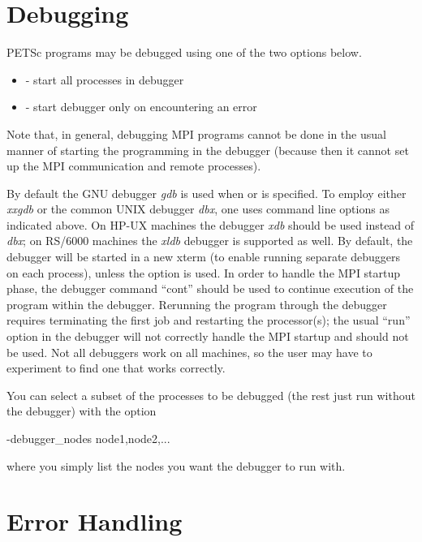 {{{\section{Debugging}  \label{sec_debugging}

PETSc programs may be debugged using one of the two options below.
\begin{itemize}
\item {}   
     - start all processes in debugger
\item {} 
       - start debugger only on encountering an error
\end{itemize}
Note that, in general, debugging MPI programs cannot be done in the usual
manner of starting the programming in the debugger (because then it cannot
set up the MPI communication and remote processes).

By default the GNU debugger {\em gdb} is used when 
or  is specified. 
To employ either {\em xxgdb} or the common UNIX debugger {\em dbx}, one uses
command line options as indicated above. On HP-UX machines the debugger
{\em xdb} should be used instead of {\em dbx}; on RS/6000 machines the
{\em xldb} debugger is supported as well.
By  default, the debugger will be started in a new xterm (to enable 
running separate debuggers on each process), unless the option 
 is used.
In order to handle the MPI startup phase, the debugger command ``cont'' 
should be used to continue execution of the program within the debugger.
Rerunning the program through the debugger requires terminating 
the first job and restarting the processor(s); the usual ``run'' 
option in the debugger will not correctly handle the MPI startup and
should not be used.  Not all debuggers work on all machines, so the user
may have to experiment to find one that works correctly.

You can select a subset of the processes to be debugged (the rest just run 
without the debugger) with the option
\begin{tabbing}
  -debugger\_nodes node1,node2,...
\end{tabbing}
where you simply list the nodes you want the debugger to run with.

\section{Error Handling}   

}}}
